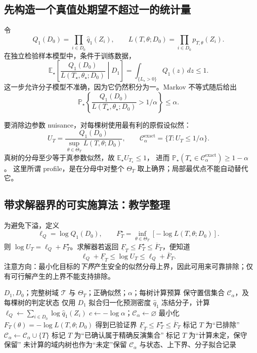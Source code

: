 \documentclass[UTF8,11pt,fontset=fandol,openany,oneside]{ctexbook}
\theoremstyle{definition}
\theoremstyle{remark}
\numberwithin{equation}{chapter}
\begin{document}
\subsection{先构造一个真值处期望不超过一的统计量}

令
\[
 Q_1(D_0)=\prod_{i\in D_0}\widehat q_1(Z_i),\qquad
 L(T,\theta;D_0)=\prod_{i\in D_0}p_{T,\theta}(Z_i).
\]
在独立检验样本模型中，条件于训练数据，
\[
 \mathbb E_\star\!\left[
 \frac{Q_1(D_0)}{L(T_\star,\theta_\star;D_0)}\middle|D_1
 \right]
 =\int_{\{L_\star>0\}}Q_1(z)\,dz\le1.
\]
这一步允许分子模型不准确，因为它仍然积分为一。Markov 不等式随后给出
\[
 \mathbb P_\star\left\{
 \frac{Q_1(D_0)}{L(T_\star,\theta_\star;D_0)}>1/\alpha
 \right\}\le\alpha.
\]

要消除边参数 nuisance，对每棵树使用最有利的原假设似然：
\begin{equation}
 U_T=\frac{Q_1(D_0)}{\sup_{\theta\in\Theta_T}L(T,\theta;D_0)},
 \qquad
 \mathcal C_\alpha^{\mathrm{exact}}=\{T:U_T\le1/\alpha\}.
 \label{eq:textbook-S15-profile}
\end{equation}
真树的分母至少等于真参数似然，故 $\mathbb E_\star U_{T_\star}\le1$，
进而 $\mathbb P_\star(T_\star\in\mathcal C_\alpha^{\mathrm{exact}})\ge1-\alpha$。
这里所谓 profile，是在分母中对整个 $\Theta_T$ 取上确界；局部最优点不能自动替代它。

\subsection{带求解器界的可实施算法：教学整理}

为避免下溢，定义
\[
 \ell_Q=\log Q_1(D_0),\qquad
 F_T^\star=\inf_{\theta\in\Theta_T}[-\log L(T,\theta;D_0)].
\]
则 $\log U_T=\ell_Q+F_T^\star$。求解器若返回
$\underline F_T\le F_T^\star\le\overline F_T$，便知道
\[
 \ell_Q+\underline F_T\le\log U_T
 \le\ell_Q+\overline F_T.
\]
注意方向：最小化目标的\emph{下界}产生安全的似然分母上界，因此可用来可靠排除；仅有可行解产生的上界不能支持排除。

\begin{algorithm}[htbp]
\caption{S15：逐树 profile 检验，数值未定时保守保留（教学整理）}
\label{alg:textbook-S15}
\begin{algorithmic}[1]
\Require $D_1,D_0$；完整树域 $\mathcal T$ 与 $\Theta_T$；正确似然；$\alpha$；每树计算预算
\Ensure 保守置信集合 $\mathcal C_\alpha$，及每棵树的判定状态
\State 仅用 $D_1$ 拟合归一化预测密度 $\widehat q_1$
\State 冻结分子，计算 $\ell_Q\gets\sum_{i\in D_0}\log\widehat q_1(Z_i)$
\State $c\gets-\log\alpha$；$\mathcal C_\alpha\gets\varnothing$
  \State 最小化 $F_T(\theta)=-\log L(T,\theta;D_0)$
  \State 得到已验证界 $\underline F_T\le F_T^\star\le\overline F_T$
    \State 标记 $T$ 为“已排除”
  \Else
    \State $\mathcal C_\alpha\gets\mathcal C_\alpha\cup\{T\}$
      \State 标记 $T$ 为“已确认属于精确反演集合”
    \Else
      \State 标记 $T$ 为“计算未定，保守保留”
    \EndIf
  \EndIf
\EndFor
\State 未计算的域内树也作为“未定”保留
\State \Return $\mathcal C_\alpha$ 与状态、上下界、分子拟合记录
\end{algorithmic}
\end{algorithm}
\end{document}
